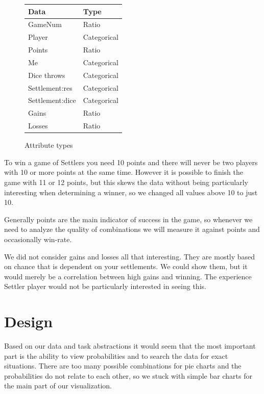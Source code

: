 \documentclass[journal]{vgtc}                %
\begin{document}
\begin{figure}
  \centering
  \begin{tabular}{|l|l|}
    \hline
    Data & Type \\ \hline
    GameNum & Ratio \\ \hline
    Player & Categorical \\ \hline
    Points & Ratio \\ \hline
    Me & Categorical \\ \hline
    Dice throws & Categorical \\ \hline
    Settlement:res & Categorical \\ \hline
    Settlement:dice & Categorical \\ \hline
    Gains & Ratio\\ \hline
    Losses & Ratio \\ \hline
  \end{tabular}
  \caption{Attribute types}
  \label{tab:types}
\end{figure}

To win a game of Settlers you need 10 points and there will never be two
players with 10 or more points at the same time. However it is possible to
finish the game with 11 or 12 points, but this skews the data without being
particularly interesting when determining a winner, so we changed all values
above 10 to just 10.

Generally points are the main indicator of success in the game, so whenever we
need to analyze the quality of combinations we will measure it against points
and occasionally win-rate.

We did not consider gains and losses all that interesting. They are mostly
based on chance that is dependent on your settlements. We could show them, but
it would merely be a correlation between high gains and winning. The
experience Settler player would not be particularly interested in seeing this.

\section{Design}

Based on our data and task abstractions it would seem that the most important
part is the ability to view probabilities and to search the data for exact
situations. There are too many possible combinations for pie charts and the
probabilities do not relate to each other, so we stuck with simple bar
charts for the main part of our visualization.
\end{document}
